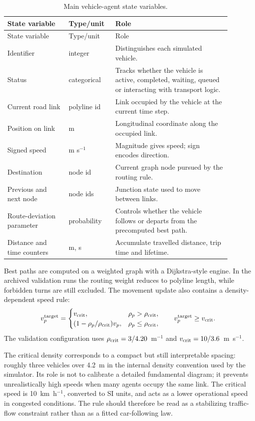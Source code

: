 \documentclass[11pt,a4paper]{article}
\begin{document}
\begin{longtable}{@{}p{0.25\linewidth}p{0.18\linewidth}p{0.47\linewidth}@{}}
\caption{Main vehicle-agent state variables.}
\label{tab:pawn-vars}\\
\toprule
State variable & Type/unit & Role \\
\midrule
\endfirsthead
\toprule
State variable & Type/unit & Role \\
\midrule
\endhead
\bottomrule
\endfoot
Identifier & integer & Distinguishes each simulated vehicle. \\
Status & categorical & Tracks whether the vehicle is active, completed,
waiting, queued or interacting with transport logic. \\
Current road link & polyline id & Link occupied by the vehicle at the
current time step. \\
Position on link & m & Longitudinal coordinate along the occupied link. \\
Signed speed & m s$^{-1}$ & Magnitude gives speed; sign encodes direction. \\
Destination & node id & Current graph node pursued by the routing rule. \\
Previous and next node & node ids & Junction state used to move between
links. \\
Route-deviation parameter & probability & Controls whether the vehicle
follows or departs from the precomputed best path. \\
Distance and time counters & m, s & Accumulate travelled distance, trip time
and lifetime. \\
\end{longtable}

Best paths are computed on a weighted graph with a Dijkstra-style engine. In the archived validation runs the routing weight reduces to polyline length, while forbidden turns are still excluded. The movement update also contains a density-dependent speed rule:
\begin{equation}
v_p^{\rm target} =
\begin{cases}
v_{\rm crit}, & \rho_p > \rho_{\rm crit},\\
(1-\rho_p/\rho_{\rm crit})v_p, & \rho_p \leq \rho_{\rm crit},
\end{cases}
\qquad
v_p^{\rm target}\geq v_{\rm crit}.
\end{equation}
The validation configuration uses $\rho_{\rm crit}=3/4.20$~m$^{-1}$ and
$v_{\rm crit}=10/3.6$~m~s$^{-1}$.

The critical density corresponds to a compact but still interpretable spacing: roughly three vehicles over 4.2~m in the internal density convention used by the simulator. Its role is not to calibrate a detailed fundamental diagram; it prevents unrealistically high speeds when many agents occupy the same link. The critical speed is 10~km~h$^{-1}$, converted to SI units, and acts as a lower operational speed in congested conditions. The rule should therefore be read as a stabilizing traffic-flow constraint rather than as a fitted car-following law.
\end{document}
